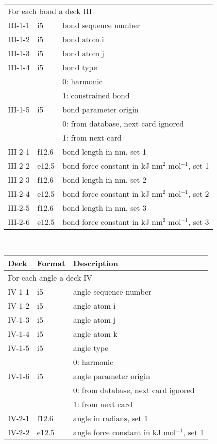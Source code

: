 \begin{center}
\begin{tabular*}{150mm}{p{12mm}p{12mm}l}
\multicolumn{3}{l}{For each bond a deck III} \\
III-1-1 & i5     & bond sequence number \\
III-1-2 & i5     & bond atom i \\
III-1-3 & i5     & bond atom j \\
III-1-4 & i5     & bond type \\
        &        & 0: harmonic\\
        &        & 1: constrained bond\\
III-1-5 & i5     & bond parameter origin\\
        &        & 0: from database, next card ignored \\
        &        & 1: from next card\\
III-2-1 & f12.6  & bond length in nm, set 1\\
III-2-2 & e12.5  & bond force constant in kJ nm$^2$ mol$^{-1}$, set 1 \\
III-2-3 & f12.6  & bond length in nm, set 2\\
III-2-4 & e12.5  & bond force constant in kJ nm$^2$ mol$^{-1}$, set 2 \\
III-2-5 & f12.6  & bond length in nm, set 3\\
III-2-6 & e12.5  & bond force constant in kJ nm$^2$ mol$^{-1}$, set 3 \\
\hline
\end{tabular*}\\
\begin{tabular*}{150mm}{p{12mm}p{12mm}l}
\hline\hline
Deck & Format & Description \\ \hline
\multicolumn{3}{l}{For each angle a deck IV} \\
IV-1-1 & i5     & angle sequence number \\
IV-1-2 & i5     & angle atom i \\
IV-1-3 & i5     & angle atom j \\
IV-1-4 & i5     & angle atom k \\
IV-1-5 & i5     & angle type \\
       &        & 0: harmonic\\
IV-1-6 & i5     & angle parameter origin\\
       &        & 0: from database, next card ignored \\
       &        & 1: from next card\\
IV-2-1 & f12.6  & angle in radians, set 1\\
IV-2-2 & e12.5  & angle force constant in kJ mol$^{-1}$, set 1 \\

\end{tabular*}
\end{center}
